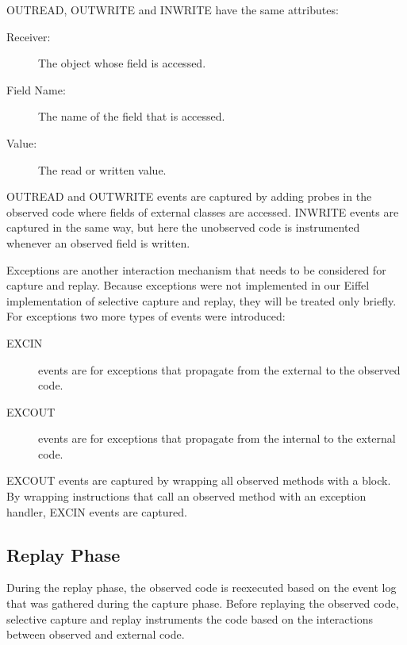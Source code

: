 OUTREAD, OUTWRITE and INWRITE have the same attributes:

\begin{description}
 \item [Receiver:] The object whose field is accessed.
 \item [Field Name:] The name of the field that is accessed.
 \item [Value:] The read or written value.
\end{description}

OUTREAD and OUTWRITE events are captured by adding probes in the observed code where fields of external classes are accessed. INWRITE events are captured in the same way, but here the unobserved code is instrumented whenever an observed field is written. 

Exceptions are another interaction mechanism that needs to be considered for capture and replay. Because exceptions were not implemented in our Eiffel implementation of selective capture and replay, they will be treated only briefly. For exceptions two more types of events were introduced:
\begin{description}
 \item [EXCIN] events are for exceptions that propagate from the external to the observed code.
 \item [EXCOUT] events are for exceptions that propagate from the internal to the external code.
\end{description}
EXCOUT events are captured by wrapping all observed methods with a  block. By wrapping instructions that call an observed method with an exception handler,  EXCIN events are captured.

\subsection{Replay Phase}
During the replay phase, the observed code is reexecuted based on the event log that was gathered during the capture phase. Before replaying the observed code, selective capture and replay instruments the code based on the interactions between observed and external code. 

